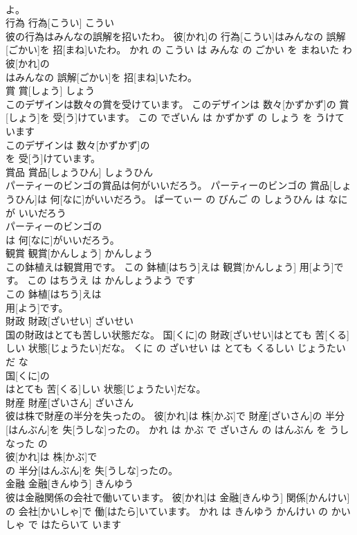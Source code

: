 \documentclass[8pt]{extreport}
\begin{document}
\begin{CJK}{UTF8}{min}
\\	よ。			
\\	行為	行為[こうい]	こうい	
\\	彼の行為はみんなの誤解を招いたわ。	彼[かれ]の 行為[こうい]はみんなの 誤解[ごかい]を 招[まね]いたわ。	かれ の こうい は みんな の ごかい を まねいた わ	
\\	彼[かれ]の
\\	はみんなの 誤解[ごかい]を 招[まね]いたわ。			
\\	賞	賞[しょう]	しょう	
\\	このデザインは数々の賞を受けています。	このデザインは 数々[かずかず]の 賞[しょう]を 受[う]けています。	この でざいん は かずかず の しょう を うけて います	
\\	このデザインは 数々[かずかず]の
\\	を 受[う]けています。			
\\	賞品	賞品[しょうひん]	しょうひん	
\\	パーティーのビンゴの賞品は何がいいだろう。	パーティーのビンゴの 賞品[しょうひん]は 何[なに]がいいだろう。	ぱーてぃー の びんご の しょうひん は なに が いいだろう	
\\	パーティーのビンゴの
\\	は 何[なに]がいいだろう。			
\\	観賞	観賞[かんしょう]	かんしょう	
\\	この鉢植えは観賞用です。	この 鉢植[はちう]えは 観賞[かんしょう] 用[よう]です。	この はちうえ は かんしょうよう です	
\\	この 鉢植[はちう]えは
\\	用[よう]です。			
\\	財政	財政[ざいせい]	ざいせい	
\\	国の財政はとても苦しい状態だな。	国[くに]の 財政[ざいせい]はとても 苦[くる]しい 状態[じょうたい]だな。	くに の ざいせい は とても くるしい じょうたい だ な	
\\	国[くに]の
\\	はとても 苦[くる]しい 状態[じょうたい]だな。			
\\	財産	財産[ざいさん]	ざいさん	
\\	彼は株で財産の半分を失ったの。	彼[かれ]は 株[かぶ]で 財産[ざいさん]の 半分[はんぶん]を 失[うしな]ったの。	かれ は かぶ で ざいさん の はんぶん を うしなった の	
\\	彼[かれ]は 株[かぶ]で
\\	の 半分[はんぶん]を 失[うしな]ったの。			
\\	金融	金融[きんゆう]	きんゆう	
\\	彼は金融関係の会社で働いています。	彼[かれ]は 金融[きんゆう] 関係[かんけい]の 会社[かいしゃ]で 働[はたら]いています。	かれ は きんゆう かんけい の かいしゃ で はたらいて います	

\end{CJK}
\end{document}
